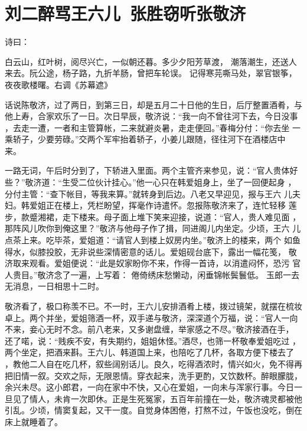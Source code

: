 \chapter{刘二醉骂王六儿~张胜窃听张敬济}

诗曰：

白云山，红叶树，阅尽兴亡，一似朝还暮。多少夕阳芳草渡，
潮落潮生，还送人来去。阮公途，杨子路，九折羊肠，曾把车轮误。
记得寒芫嘶马处，翠官银筝，夜夜歌楼曙。右调《苏幕遮》

话说陈敬济，过了两日，到第三日，却是五月二十日他的生日，后厅整置酒肴，与
他上寿，合家欢乐了一日。次日早辰，敬济说：“我一向不曾往河下去，今日没事
，去走一遭，一者和主管算帐，二来就避炎暑，走走便回。”春梅分付：“你去坐
一乘轿子，少要劳碌。”交两个军牢抬着轿子，小姜儿跟随，径往河下在酒楼店中
来。

一路无词，午后时分到了，下轿进入里面。两个主管齐来参见，说：“官人贵体好
些？”敬济道：“生受二位伙计挂心。”他一心只在韩爱姐身上，坐了一回便起身
，分付主管：“查下帐目，等我来算。”就转身到后边。八老又早迎见，报与王六
儿夫妇。韩爱姐正在楼上，凭栏盼望，挥毫作诗遣怀。忽报陈敬济来了，连忙轻移
莲步，款蹙湘裙，走下楼来。母子面上堆下笑来迎接，说道：“官人，贵人难见面
，那阵风儿吹你到俺这里？”敬济与他母子作了揖，同进阁儿内坐定。少顷，王六
儿点茶上来。吃毕茶，爱姐道：“请官人到楼上奴房内坐。”敬济上的楼来，两个
如鱼得水，似膝投胶，无非说些深情密意的话儿。爱姐砚台底下，露出一幅花笺，
敬济取来观看。爱姐便说：“此是奴家盼你不来，作得一首诗，以消遣闷怀，恐污
官人贵目。”敬济念了一遍，上写着：
倦倚绣床愁懒动，闲垂锦帐鬓鬟低。
玉郎一去无消息，一日相思十二时。

敬济看了，极口称羡不已。不一时，王六儿安排酒肴上楼，拨过镜架，就摆在梳妆
卓上。两个并坐，爱姐筛酒一杯，双手递与敬济，深深道个万福，说：“官人一向
不来，妾心无时不念。前八老来，又多谢盘缠，举家感之不尽。”敬济接酒在手，
还了喏，说：“贱疾不安，有失期约，姐姐休怪。”酒尽，也筛一杯敬奉爱姐吃过
，两个坐定，把酒来斟。王六儿、韩道国上来，也陪吃了几杯，各取方便下楼去了
，教他二人自在吃几杯，叙些阔别话儿。良久，吃得酒浓时，情兴如火，免不得再
把旧情一叙。交欢之际，无限恩情。穿衣起来，洗手更酌，又饮数杯。醉眼朦胧，
余兴未尽。这小郎君，一向在家中不快，又心在爱姐，一向未与浑家行事。今日一
旦见了情人，未肯一次即休。正是生死冤家，五百年前撞在一处，敬济魂灵都被他
引乱。少顷，情窦复起，又干一度。自觉身体困倦，打熬不过，午饭也没吃，倒在
床上就睡着了。

